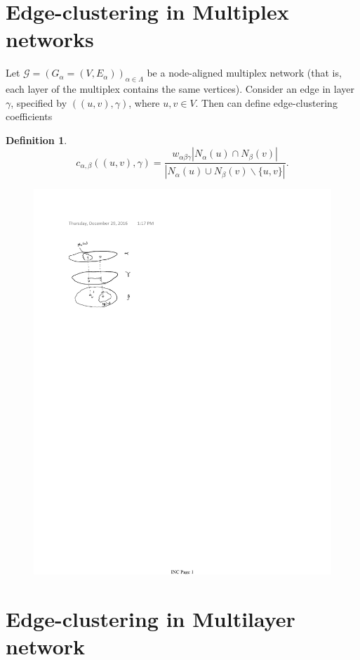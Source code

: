 \documentclass[twocolumn]{IEEEtran}
\newtheorem{definition}{Definition}
\theoremstyle{definition}
\begin{document}
\section{Edge-clustering in Multiplex networks}
Let $\mathscr{G} = ( G_\alpha = (V, E_\alpha) )_{\alpha \in \Lambda} $ be a node-aligned multiplex network (that is, each layer of the multiplex contains the same vertices).
Consider an edge in layer $\gamma$, 
specified by $((u,v), \gamma)$, where $u,v \in V$.
Then can define edge-clustering coefficients 
\begin{definition}
  \[ c_{\alpha,\beta}( (u,v), \gamma )  = \frac{ w_{\alpha \beta \gamma} \left|N_{\alpha}(u) \cap N_{\beta}(v) \right| }{ \left| N_\alpha(u) \cup N_\beta(v) \backslash \{u, v\} \right|  }. \]

\begin{figure}
  \includegraphics{fig1}
\end{figure}
\end{definition}
\section{Edge-clustering in Multilayer network}
\end{document}
